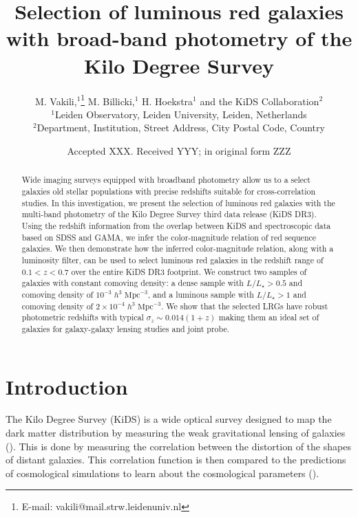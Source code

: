 \documentclass[fleqn,usenatbib]{mnras}
\title[KiDS LRGs]{Selection of luminous red galaxies with broad-band photometry of the Kilo Degree Survey}
\author[M. Vakili et al.]{
M. Vakili,$^{1}$\thanks{E-mail: vakili@mail.strw.leidenuniv.nl}
M. Billicki,$^{1}$
H. Hoekstra$^{1}$
and the KiDS Collaboration$^{2}$
\\
$^{1}$Leiden Observatory, Leiden University, Leiden, Netherlands\\
$^{2}$Department, Institution, Street Address, City Postal Code, Country
}
\date{Accepted XXX. Received YYY; in original form ZZZ}
\begin{document}
\label{firstpage}
\pagerange{\pageref{firstpage}--\pageref{lastpage}}
\maketitle

\begin{abstract}
Wide imaging surveys equipped with 
broadband photometry allow us to a select galaxies old stellar populations with precise redshifts suitable for 
cross-correlation studies. In this investigation, we present the selection of luminous red galaxies with 
the multi-band photometry of the Kilo Degree Survey third data release (KiDS DR3). Using the 
redshift information from the overlap between KiDS and spectroscopic data based on SDSS and GAMA, 
we infer the color-magnitude relation of red sequence galaxies. We then demonstrate how the 
inferred color-magnitude relation, along with a luminosity filter, can be used to select luminous 
red galaxies in the redshift range of $0.1<z<0.7$ over the entire KiDS DR3  footprint. We construct two samples of galaxies with constant comoving density: a dense sample with $L/L_{\star}>0.5$ and comoving density of $10^{-3} \; h^{3}\; \mathrm{Mpc}^{-3}$, and a luminous sample with $L/L_{\star}>1$ and comoving density of $2 \times 10^{-4} \; h^{3}\; \mathrm{Mpc}^{-3}$. 
We show that the selected LRGs have robust photometric redshifts with typical $\sigma_z \sim 0.014 (1+z)$  making them an ideal set of galaxies for galaxy-galaxy lensing studies and joint probe.
\end{abstract}

\begin{keywords}
\end{keywords}
\textbf{}\clearpage


\section{Introduction}

The Kilo Degree Survey (KiDS) is a wide optical survey designed to map the dark matter distribution by measuring the weak gravitational lensing of galaxies (\citealt{kids}). This is done by measuring the correlation between the distortion of the shapes of distant galaxies. This correlation function is then compared to the predictions of 
cosmological simulations to learn about the cosmological parameters (\citealt{hendrick2017,joudaki2017}). 
\end{document}
